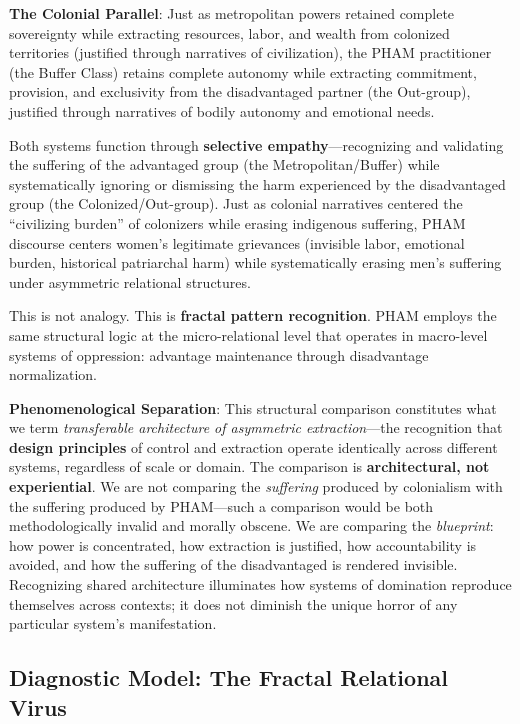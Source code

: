 \documentclass[12pt,openany]{book}
\numberwithin{equation}{chapter}
\begin{document}
\textbf{The Colonial Parallel}: Just as metropolitan powers retained complete sovereignty while extracting resources, labor, and wealth from colonized territories (justified through narratives of civilization), the PHAM practitioner (the Buffer Class) retains complete autonomy while extracting commitment, provision, and exclusivity from the disadvantaged partner (the Out-group), justified through narratives of bodily autonomy and emotional needs.

Both systems function through \textbf{selective empathy}---recognizing and validating the suffering of the advantaged group (the Metropolitan/Buffer) while systematically ignoring or dismissing the harm experienced by the disadvantaged group (the Colonized/Out-group). Just as colonial narratives centered the ``civilizing burden'' of colonizers while erasing indigenous suffering, PHAM discourse centers women's legitimate grievances (invisible labor, emotional burden, historical patriarchal harm) while systematically erasing men's suffering under asymmetric relational structures.

This is not analogy. This is \textbf{fractal pattern recognition}. PHAM employs the same structural logic at the micro-relational level that operates in macro-level systems of oppression: advantage maintenance through disadvantage normalization.

\textbf{Phenomenological Separation}: This structural comparison constitutes what we term \textit{transferable architecture of asymmetric extraction}---the recognition that \textbf{design principles} of control and extraction operate identically across different systems, regardless of scale or domain. The comparison is \textbf{architectural, not experiential}. We are not comparing the \textit{suffering} produced by colonialism with the suffering produced by PHAM---such a comparison would be both methodologically invalid and morally obscene. We are comparing the \textit{blueprint}: how power is concentrated, how extraction is justified, how accountability is avoided, and how the suffering of the disadvantaged is rendered invisible. Recognizing shared architecture illuminates how systems of domination reproduce themselves across contexts; it does not diminish the unique horror of any particular system's manifestation.

\subsection{Diagnostic Model: The Fractal Relational Virus}
\end{document}
